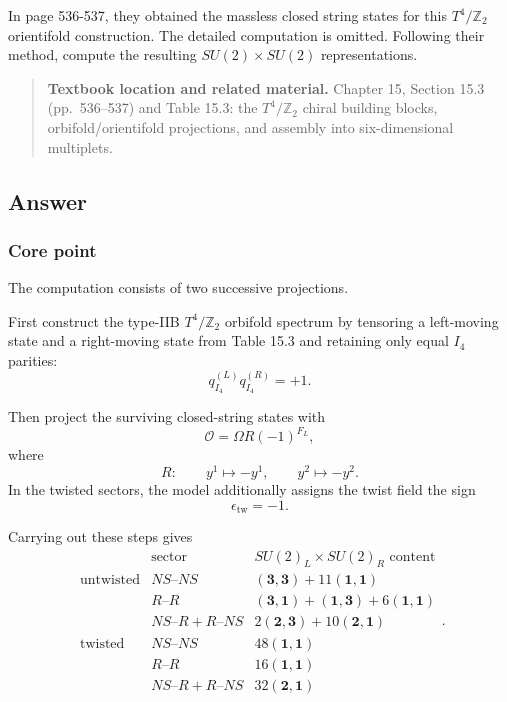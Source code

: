 \documentclass[
  10pt,
  a4paper,
  openany]{book}
\begin{document}
In page 536-537, they obtained the massless closed string states for
this \(T^4/\mathbb{Z}_{2}\) orientifold construction. The detailed
computation is omitted. Following their method, compute the resulting
\(SU(2)\times SU(2)\) representations.

\begin{quote}
\textbf{Textbook location and related material.} Chapter 15, Section
15.3 (pp.~536--537) and Table 15.3: the \(T^4/\mathbb Z_2\) chiral
building blocks, orbifold/orientifold projections, and assembly into
six-dimensional multiplets.
\end{quote}

\subsection{Answer}\label{answer-24}

\subsubsection{Core point}\label{core-point-24}

The computation consists of two successive projections.

First construct the type-IIB \(T^4/\mathbb Z_2\) orbifold spectrum by
tensoring a left-moving state and a right-moving state from Table 15.3
and retaining only equal \(I_4\) parities: \[
q_{I_4}^{(L)}q_{I_4}^{(R)}=+1.
\]

Then project the surviving closed-string states with \[
\mathcal O
=
\Omega R(-1)^{F_L},
\] where \[
R:
\qquad
y^1\mapsto-y^1,
\qquad
y^2\mapsto-y^2.
\] In the twisted sectors, the model additionally assigns the twist
field the sign \[
\epsilon_{\mathrm{tw}}=-1.
\]

Carrying out these steps gives \[
\boxed{
\begin{array}{c|c|l}
&\text{sector}&SU(2)_L\times SU(2)_R\text{ content}\\ \hline
\text{untwisted}
&NS\text{--}NS
&(\mathbf3,\mathbf3)+11(\mathbf1,\mathbf1)\\
&
R\text{--}R
&(\mathbf3,\mathbf1)+(\mathbf1,\mathbf3)+6(\mathbf1,\mathbf1)\\
&
NS\text{--}R+R\text{--}NS
&2(\mathbf2,\mathbf3)+10(\mathbf2,\mathbf1)\\ \hline
\text{twisted}
&NS\text{--}NS
&48(\mathbf1,\mathbf1)\\
&
R\text{--}R
&16(\mathbf1,\mathbf1)\\
&
NS\text{--}R+R\text{--}NS
&32(\mathbf2,\mathbf1)
\end{array}
}.
\]
\end{document}
